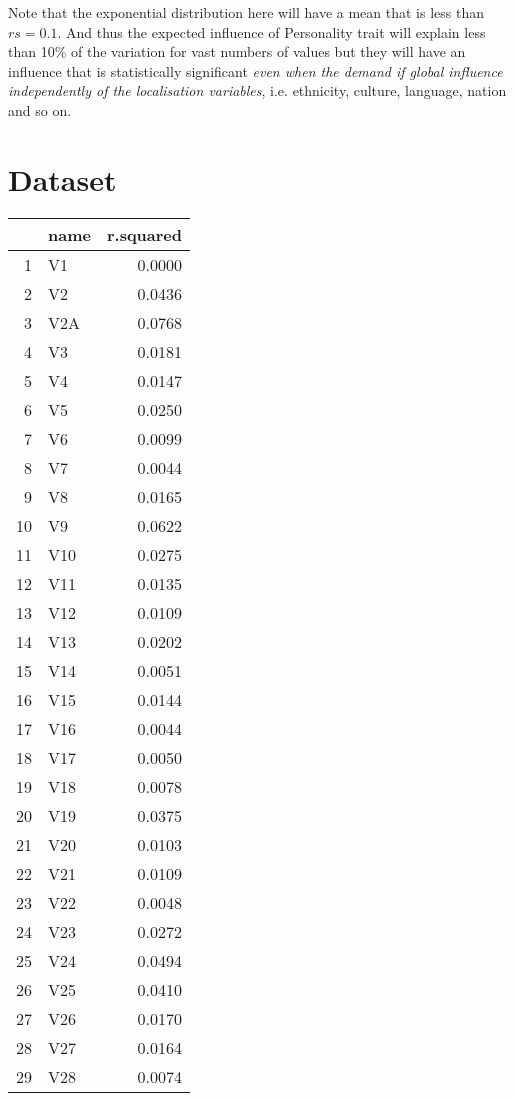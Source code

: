 \documentclass{amsart}
\begin{document}
Note that the exponential distribution here will have a mean that is less than $rs=0.1$.  And thus the expected influence of Personality trait will explain less than 10\% of the variation for vast numbers of values but they will have an influence that is statistically significant {\em even when the demand if global influence independently of the localisation variables}, i.e. ethnicity, culture, language, nation and so on.

\section{Dataset}
\begin{longtable}{rlr}
  \hline
 & name & r.squared \\ 
  \hline
1 & V1 & 0.0000 \\ 
  2 & V2 & 0.0436 \\ 
  3 & V2A & 0.0768 \\ 
  4 & V3 & 0.0181 \\ 
  5 & V4 & 0.0147 \\ 
  6 & V5 & 0.0250 \\ 
  7 & V6 & 0.0099 \\ 
  8 & V7 & 0.0044 \\ 
  9 & V8 & 0.0165 \\ 
  10 & V9 & 0.0622 \\ 
  11 & V10 & 0.0275 \\ 
  12 & V11 & 0.0135 \\ 
  13 & V12 & 0.0109 \\ 
  14 & V13 & 0.0202 \\ 
  15 & V14 & 0.0051 \\ 
  16 & V15 & 0.0144 \\ 
  17 & V16 & 0.0044 \\ 
  18 & V17 & 0.0050 \\ 
  19 & V18 & 0.0078 \\ 
  20 & V19 & 0.0375 \\ 
  21 & V20 & 0.0103 \\ 
  22 & V21 & 0.0109 \\ 
  23 & V22 & 0.0048 \\ 
  24 & V23 & 0.0272 \\ 
  25 & V24 & 0.0494 \\ 
  26 & V25 & 0.0410 \\ 
  27 & V26 & 0.0170 \\ 
  28 & V27 & 0.0164 \\ 
  29 & V28 & 0.0074 \\ 

\end{longtable}
\end{document}
